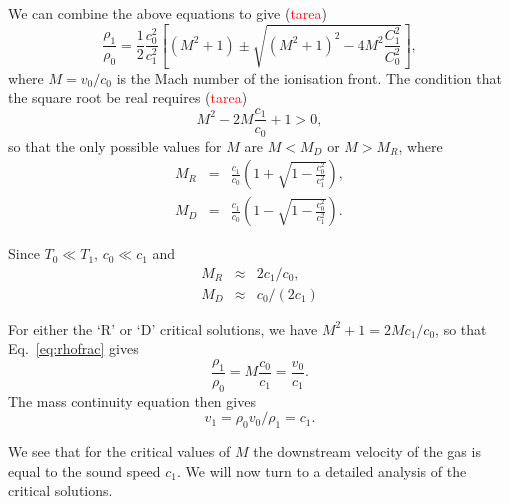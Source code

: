 \begin{frame}{}

We can combine the above equations to give (\textcolor{red}{tarea})
\begin{equation}
\frac{\rho_1}{\rho_0} =  \frac{1}{2} \frac{c_0^2}{c_1^2} \left[
(M^2 + 1) \pm \sqrt{ (M^2+1)^2 - 4M^2 \frac{C_1^2}{C_0^2}} 
\right] , \label{eq:rhofrac}
\end{equation}
where $M = v_0 /c_0 $ is the Mach number of the ionisation front. 
The condition that the square root be real requires 
(\textcolor{red}{tarea})
\begin{equation}
M^2 - 2M \frac{c_1}{c_0} + 1 > 0, 
\end{equation}
so that the only possible values for $M$ are $ M < M_D$ or $ M > M_R$,
where 
\begin{eqnarray}
M_R  & =  & \frac{c_1}{c_0} \left( 1 + \sqrt{ 1 - \frac{c_0^2}{c_1^2} }
\right), \\
M_D  & =  & \frac{c_1}{c_0} \left( 1 - \sqrt{ 1 - \frac{c_0^2}{c_1^2} }
\right). 
\end{eqnarray}



\end{frame}






\begin{frame}{}

Since $T_0\ll T_1$, $c_0 \ll c_1$ and 
\begin{eqnarray}
M_R  & \approx  & 2 c_1/c_0, \\
M_D  & \approx  & c_0/ (2 c_1)
\end{eqnarray}

For either the `R' or `D' critical solutions, we have 
$M^2 + 1 = 2 M c_1/c_0$, so that Eq.~\ref{eq:rhofrac} gives 
\begin{equation}
\frac{\rho_1}{\rho_0}  = M \frac{c_0}{c_1} = \frac{v_0}{c_1}.
\end{equation}
The mass continuity equation then gives 
\begin{equation}
v_1 = \rho_0 v_0 / \rho_1 = c_1. 
\end{equation}

We see that for the critical values of $M$ the downstream velocity of
the gas is equal to the sound speed $c_1$.  We will now turn to a
detailed analysis of the critical solutions. 

\end{frame}




